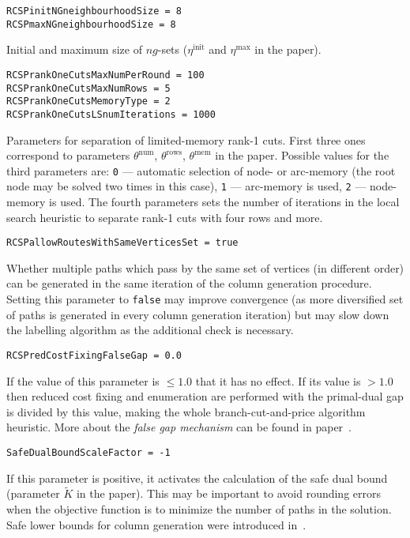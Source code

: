 \documentclass[10pt,a4paper]{article}
\begin{document}
\begin{lstlisting}
RCSPinitNGneighbourhoodSize = 8
RCSPmaxNGneighbourhoodSize = 8
\end{lstlisting}
Initial and maximum size of $ng$-sets ($\eta^{\mathrm{init}}$ and $\eta^{\mathrm{max}}$ in the paper).

\begin{lstlisting}
RCSPrankOneCutsMaxNumPerRound = 100
RCSPrankOneCutsMaxNumRows = 5
RCSPrankOneCutsMemoryType = 2
RCSPrankOneCutsLSnumIterations = 1000
\end{lstlisting}
Parameters for separation of limited-memory rank-1 cuts. First three ones correspond to parameters
$\theta^{\mathrm{num}}$, $\theta^{\mathrm{rows}}$, $\theta^{\mathrm{mem}}$ in the paper. Possible values for the third
parameters are: \verb+0+ --- automatic selection of node- or arc-memory (the root node may be solved two times in this
case), \verb+1+ --- arc-memory is used, \verb+2+ --- node-memory is used. The fourth parameters sets the number of
iterations in the local search heuristic to separate rank-1 cuts with four rows and more.

\begin{lstlisting}
RCSPallowRoutesWithSameVerticesSet = true
\end{lstlisting}
Whether multiple paths which pass by the same set of vertices (in different order) can be generated in the same
iteration of the column generation procedure. Setting this parameter to \verb+false+ may improve convergence (as more
diversified set of paths is generated in every column generation iteration) but may slow down the labelling algorithm as
the additional check is necessary.

\begin{lstlisting}
RCSPredCostFixingFalseGap = 0.0
\end{lstlisting}
If the value of this parameter is $\leq 1.0$ that it has no effect. If its value is $>1.0$ then reduced cost fixing and
enumeration are performed with the primal-dual gap is divided by this value, making the whole branch-cut-and-price
algorithm heuristic. More about the \emph{false gap mechanism} can be found in paper~\cite{QueirogaSadykovUchoa:21o}.

\begin{lstlisting}
SafeDualBoundScaleFactor = -1
\end{lstlisting}
If this parameter is positive, it activates the calculation of the safe dual bound (parameter $\tilde{K}$ in the
paper). This may be important to avoid rounding errors when the objective function is to minimize the number of paths in
the solution. Safe lower bounds for column generation were introduced in~\cite{HeldCookSewell:12a}.
\end{document}
